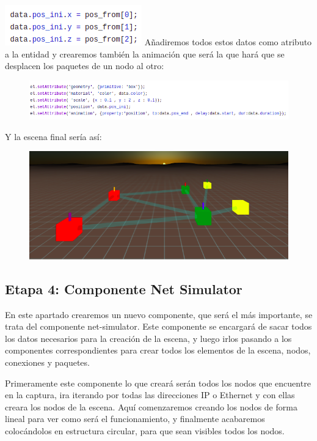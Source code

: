 \documentclass[a4paper, 12pt]{book}
\begin{document}
    \includegraphics[scale=0.7]{img/pos_packet2.png}
\newpage
Añadiremos todos estos datos como atributo a la entidad y crearemos también la animación que será la que hará que se desplacen los paquetes de un nodo al otro:


\begin{figure}[h]
\centering
    \includegraphics[scale=0.6]{img/atributos_packet.png}
\end{figure}

Y la escena  final sería así:
\begin{figure}[h]
\centering
    \includegraphics[scale=0.7]{img/componentePACKET.png}
\end{figure}

\newpage
\subsection{Etapa 4: Componente Net Simulator}
En este apartado crearemos un nuevo componente, que será el más importante, se trata del componente net-simulator.
Este componente se encargará de sacar todos los datos necesarios para la creación de la escena, y luego irlos pasando a los componentes correspondientes para crear todos los elementos de la escena, nodos, conexiones y paquetes.

Primeramente este componente lo que creará serán todos los nodos que encuentre en la captura, ira iterando por todas las direcciones IP o Ethernet y con ellas creara los nodos de la escena. Aquí comenzaremos creando los nodos de forma lineal para ver como será el funcionamiento, y finalmente acabaremos colocándolos en estructura circular, para que sean visibles todos los nodos.
\end{document}
